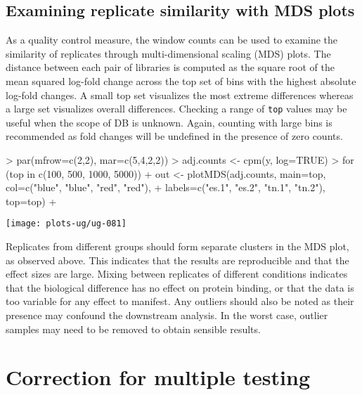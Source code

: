 \documentclass[12pt]{report}
\renewenvironment{Schunk}{\vspace{0pt}}{\vspace{0pt}}
\newcommand{\code}[1]{{\small\texttt{#1}}}
\begin{document}
\section{Examining replicate similarity with MDS plots}
As a quality control measure, the window counts can be used to examine the similarity of replicates through multi-dimensional scaling (MDS) plots. 
The distance between each pair of libraries is computed as the square root of the mean squared log-fold change across the top set of bins with the highest absolute log-fold changes.
A small top set visualizes the most extreme differences whereas a large set visualizes overall differences.
Checking a range of \code{top} values may be useful when the scope of DB is unknown.
Again, counting with large bins is recommended as fold changes will be undefined in the presence of zero counts.

\begin{Schunk}
\begin{Sinput}
> par(mfrow=c(2,2), mar=c(5,4,2,2))
> adj.counts <- cpm(y, log=TRUE)
> for (top in c(100, 500, 1000, 5000)) {
+     out <- plotMDS(adj.counts, main=top, col=c("blue", "blue", "red", "red"),
+         labels=c("es.1", "es.2", "tn.1", "tn.2"), top=top)
+ }
\end{Sinput}
\end{Schunk}

\begin{center}
\texttt{[image: plots-ug/ug-081]}
\end{center}

Replicates from different groups should form separate clusters in the MDS plot, as observed above.
This indicates that the results are reproducible and that the effect sizes are large.
Mixing between replicates of different conditions indicates that the biological difference has no effect on protein binding, or that the data is too variable for any effect to manifest.
Any outliers should also be noted as their presence may confound the downstream analysis.
In the worst case, outlier samples may need to be removed to obtain sensible results.



\chapter{Correction for multiple testing}
\end{document}
